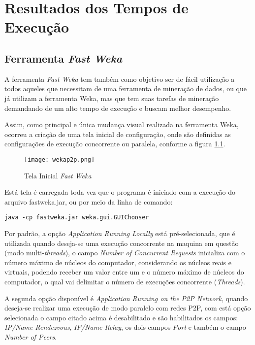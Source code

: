 \appendix
\chapter{Resultados dos Tempos de Execução}

\section{Ferramenta \textit{Fast Weka}}
A ferramenta \textit{Fast Weka} tem também como objetivo ser de fácil utilização a todos aqueles que necessitam de uma ferramenta de mineração de dados, ou que já utilizam a ferramenta Weka, mas que tem suas tarefas de mineração demandando de um alto tempo de execução e buscam melhor desempenho.

Assim, como principal e única mudança visual realizada na ferramenta Weka, ocorreu a criação de uma tela inicial de configuração, onde são definidas as configurações de execução concorrente ou paralela, conforme a figura \ref{fig:telainicial}.

\begin{figure}[h!]

\centering
\caption{Tela Inicial \textit{Fast Weka}}

\texttt{[image: wekap2p.png]}

\label{fig:telainicial}
\end{figure}

Está tela é carregada toda vez que o programa é iniciado com a execução do arquivo fastweka.jar, ou por meio da linha de comando:
\begin{Verbatim}[frame=single]
java -cp fastweka.jar weka.gui.GUIChooser
\end{Verbatim}

Por padrão, a opção \textit{Application Running Locally} está pré-selecionada, que é utilizada quando deseja-se uma execução concorrente na maquina em questão (modo multi-\textit{threads}), o campo \textit{Number of Concurrent Requests} inicializa com o número máximo de núcleos do computador, considerando os núcleos reais e virtuais, podendo receber um valor entre um e o número máximo de núcleos do computador, o qual vai delimitar o número de execuções concorrente (\textit{Threads}).

A segunda opção disponível é \textit{Application Running on the P2P Network}, quando deseja-se realizar uma execução de modo paralelo com redes P2P, com está opção selecionada o campo citado acima é desabilitado e são habilitados os campos: \textit{IP/Name Rendezvous}, \textit{IP/Name Relay}, os dois campos \textit{Port} e também o campo \textit{Number of Peers}.


